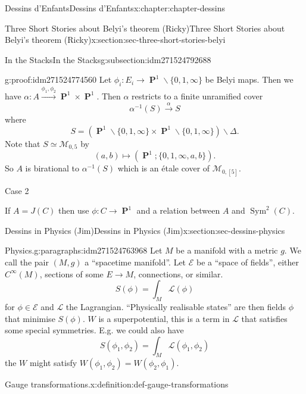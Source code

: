 \documentclass[oneside,10pt,]{book}
\numberwithin{equation}{section}
\newcommand{\cinf}{C^\infty}
\newcommand{\inv}{^{-1}}
\newcommand{\lb}{[}
\newcommand{\rb}{]}
\DeclareMathOperator{\PP}{\mathbf{P}}
\DeclareMathOperator{\Sym}{Sym}
\begin{document}
\begin{chapterptx}{Dessins d'Enfants}{}{Dessins d'Enfants}{}{}{x:chapter:chapter-dessins}
\begin{sectionptx}{Three Short Stories about Belyi's theorem (Ricky)}{}{Three Short Stories about Belyi's theorem (Ricky)}{}{}{x:section:sec-three-short-stories-belyi}
\begin{subsectionptx}{In the Stacks}{}{In the Stacks}{}{}{g:subsection:idm271524792688}
\begin{proofptx}{}{g:proof:idm271524774560}
Let \(\phi_i \colon E_i \to \PP^1\smallsetminus \{0,1,\infty\}\) be Belyi maps. Then we have \(\alpha \colon A \xrightarrow{\phi_1,\phi_2} \PP^1 \times \PP^1\). Then \(\alpha\) restricts to a finite unramified cover%
\begin{equation*}
\alpha\inv (S) \xrightarrow \alpha S
\end{equation*}
where%
\begin{equation*}
S = (\PP^1 \smallsetminus \{0,1,\infty\} \times \PP^1 \smallsetminus \{0,1,\infty\}) \smallsetminus \Delta\text{.}
\end{equation*}
Note that \(S \simeq \mathcal M_{0,5}\) by%
\begin{equation*}
(a,b ) \mapsto (\PP^1; \{0,1,\infty, a,b\})\text{.}
\end{equation*}
So \(A\) is birational to \(\alpha\inv (S)\) which is an étale cover of \(\mathcal M_{0,\lb 5 \rb}\).%
\par
Case 2%
\par
If \(A = J(C)\) then use \(\phi \colon C \to \PP^1\) and a relation between \(A\) and \(\Sym^2(C)\).%
\end{proofptx}
\end{subsectionptx}
\end{sectionptx}
%
%
\typeout{************************************************}
\typeout{************************************************}
%
\begin{sectionptx}{Dessins in Physics (Jim)}{}{Dessins in Physics (Jim)}{}{}{x:section:sec-dessins-physics}
\begin{paragraphs}{Physics.}{g:paragraphs:idm271524763968}%
Let  \(M\)  be a manifold with  a metric \(g\). We call the pair \((M,g)\) a ``spacetime manifold''. Let \(\mathcal E\) be  a ``space of fields'', either \(\cinf (M)\), sections of some \(E\to M\), connections, or similar.%
\begin{equation*}
S(\phi) = \int_M \mathcal    L (\phi)
\end{equation*}
for \(\phi\in \mathcal E\) and \(\mathcal L\) the Lagrangian. ``Physically realisable states'' are then fields \(\phi\) that minimise \(S(\phi)\). \(W\) is a superpotential, this is a term in \(\mathcal L\) that satisfies some special symmetries. E.g. we could also have%
\begin{equation*}
S(\phi_1, \phi_2) = \int_M \mathcal L(\phi_1,\phi_2)
\end{equation*}
the \(W\) might satisfy \(W(\phi_1, \phi_2) = W(\phi_2, \phi_1)\).%
\begin{definition}{Gauge transformations.}{x:definition:def-gauge-transformations}%

\end{definition}
\end{paragraphs}
\end{sectionptx}
\end{chapterptx}
\end{document}
